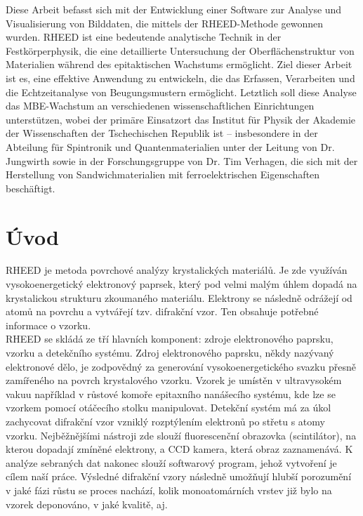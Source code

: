 \documentclass[a4paper,11pt]{article}
\begin{document}
Diese Arbeit befasst sich mit der Entwicklung einer Software zur Analyse und Visualisierung von Bilddaten, die mittels der RHEED-Methode gewonnen wurden. RHEED ist eine bedeutende analytische Technik in der Festkörperphysik, die eine detaillierte Untersuchung der Oberflächenstruktur von Materialien während des epitaktischen Wachstums ermöglicht. Ziel dieser Arbeit ist es, eine effektive Anwendung zu entwickeln, die das Erfassen, Verarbeiten und die Echtzeitanalyse von Beugungsmustern ermöglicht. Letztlich soll diese Analyse das MBE-Wachstum an verschiedenen wissenschaftlichen Einrichtungen unterstützen, wobei der primäre Einsatzort das Institut für Physik der Akademie der Wissenschaften der Tschechischen Republik ist – insbesondere in der Abteilung für Spintronik und Quantenmaterialien unter der Leitung von Dr. Jungwirth sowie in der Forschungsgruppe von Dr. Tim Verhagen, die sich mit der Herstellung von Sandwichmaterialien mit ferroelektrischen Eigenschaften beschäftigt.
\newpage

\section{Úvod}
    RHEED je metoda povrchové analýzy krystalických materiálů. Je zde využíván vysokoenergetický elektronový paprsek, který pod velmi malým úhlem dopadá na krystalickou strukturu zkoumaného materiálu. Elektrony se následně odrážejí od atomů na povrchu a vytvářejí tzv. difrakční vzor. Ten obsahuje potřebné informace o vzorku.\\

    RHEED se skládá ze tří hlavních komponent: zdroje elektronového paprsku, vzorku a detekčního systému. Zdroj elektronového paprsku, někdy nazývaný elektronové dělo, je zodpovědný za generování vysokoenergetického svazku přesně zamířeného na povrch krystalového vzorku. Vzorek je umístěn v ultravysokém vakuu například v růstové komoře epitaxního nanášecího systému, kde lze se vzorkem pomocí otáčecího stolku manipulovat. Detekční systém má za úkol zachycovat difrakční vzor vzniklý rozptýlením elektronů po střetu s atomy vzorku. Nejběžnějšími nástroji zde slouží fluorescenční obrazovka (scintilátor), na kterou dopadají zmíněné elektrony, a CCD kamera, která obraz zaznamenává. K analýze sebraných dat nakonec slouží softwarový program, jehož vytvoření je cílem naší práce. Výsledné difrakční vzory následně umožňují hlubší porozumění v jaké fázi růstu se proces nachází, kolik monoatomárních vrstev již bylo na vzorek deponováno, v jaké kvalitě, aj.
    
\end{document}
